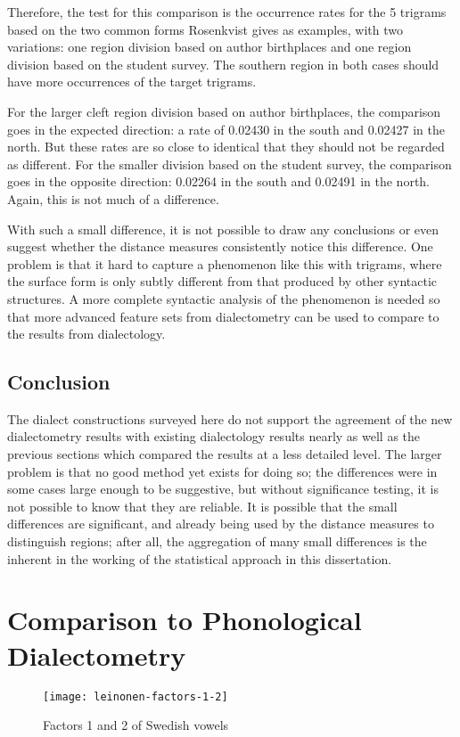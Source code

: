 Therefore, the test for this comparison is the occurrence rates
for the 5 trigrams based on the two common forms Rosenkvist gives as
examples, with two variations: one region division based on author
birthplaces and one region division based on the student survey. The
southern region in both cases should have more occurrences of the
target trigrams.

For the larger cleft region division based on author birthplaces, the
comparison goes in the expected direction: a rate of 0.02430 in the
south and 0.02427 in the north. But these rates are so close to identical
that they should not be regarded as different. For the smaller division
based on the student survey, the comparison goes in the opposite
direction: 0.02264 in the south and 0.02491 in the north. Again, this
is not much of a difference.

With such a small difference, it is not possible to draw any
conclusions or even suggest whether the distance measures consistently
notice this difference. One problem is that it hard to capture a
phenomenon like this with trigrams, where the surface form is only
subtly different from that produced by other syntactic structures. A
more complete syntactic analysis of the phenomenon is needed so that
more advanced feature sets from dialectometry can be used to compare
to the results from dialectology.

\subsection{Conclusion}

The dialect constructions surveyed here do not support the agreement
of the new dialectometry results with existing dialectology results
nearly as well as the previous sections which compared the results at
a less detailed level. The larger problem is that no good method yet
exists for doing so; the differences were in some cases large enough
to be suggestive, but without significance testing, it is not possible
to know that they are reliable. It is possible that the small
differences are significant, and already being used by the distance
measures to distinguish regions; after all, the aggregation of many
small differences is the inherent in the working of the statistical
approach in this dissertation.

\section{Comparison to Phonological Dialectometry}
\label{discussion-chapter-phonological-dialectometry}
\begin{figure}
  \texttt{[image: leinonen-factors-1-2]}
  \caption{Factors 1 and 2 of Swedish vowels}
  \label{leinonen-factors-1-2}
\end{figure}

